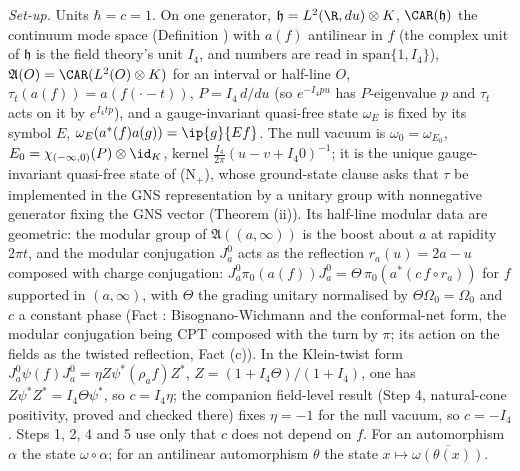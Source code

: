 \emph{Set-up.} Units $\hbar = c = 1$. On one generator, $\mathfrak{h} = L^{2}(\R, du)\otimes K$, $\CAR(\mathfrak{h})$ the continuum mode space (Definition ) with $a(f)$ antilinear in $f$ (the complex unit of $\mathfrak{h}$ is the field theory's unit $I_{4}$, and numbers are read in $\mathrm{span}\{1, I_{4}\}$), $\mathfrak{A}(O) = \CAR(L^{2}(O)\otimes K)$ for an interval or half-line $O$, $\tau_{t}(a(f)) = a(f(\cdot - t))$, $P = I_{4}\,d/du$ (so $e^{-I_{4}pu}$ has $P$-eigenvalue $p$ and $\tau_{t}$ acts on it by $e^{I_{4}tp}$), and a gauge-invariant quasi-free state $\omega_{E}$ is fixed by its symbol $E$, $\omega_{E}(a^{*}(f)a(g)) = \ip{g}{Ef}$. The null vacuum is $\omega_{0} = \omega_{E_{0}}$, $E_{0} = \chi_{(-\infty,0)}(P)\otimes\id_{K}$, kernel $\tfrac{I_{4}}{2\pi}(u - v + I_{4}0)^{-1}$; it is the unique gauge-invariant quasi-free state of (N$_{+}$), whose ground-state clause asks that $\tau$ be implemented in the GNS representation by a unitary group with nonnegative generator fixing the GNS vector (Theorem (ii)). Its half-line modular data are geometric: the modular group of $\mathfrak{A}((a, \infty))$ is the boost about $a$ at rapidity $2\pi t$, and the modular conjugation $J^{0}_{a}$ acts as the reflection $r_{a}(u) = 2a - u$ composed with charge conjugation: $J^{0}_{a}\pi_{0}(a(f))J^{0}_{a} = \Theta\,\pi_{0}(a^{*}(c\,f\circ r_{a}))$ for $f$ supported in $(a, \infty)$, with $\Theta$ the grading unitary normalised by $\Theta\Omega_{0} = \Omega_{0}$ and $c$ a constant phase (Fact : Bisognano-Wichmann and the conformal-net form, the modular conjugation being CPT composed with the turn by $\pi$; its action on the fields as the twisted reflection, Fact (c)). In the Klein-twist form $J^{0}_{a}\psi(f)J^{0}_{a} = \eta Z\psi^{*}(\rho_{a}f)Z^{*}$, $Z = (1 + I_{4}\Theta)/(1 + I_{4})$, one has $Z\psi^{*}Z^{*} = I_{4}\Theta\psi^{*}$, so $c = I_{4}\eta$; the companion field-level result  (Step 4, natural-cone positivity, proved and checked there) fixes $\eta = -1$ for the null vacuum, so $c = -I_{4}$. Steps 1, 2, 4 and 5 use only that $c$ does not depend on $f$. For an automorphism $\alpha$ the state $\omega\circ\alpha$; for an antilinear automorphism $\theta$ the state $x \mapsto \overline{\omega(\theta(x))}$.

